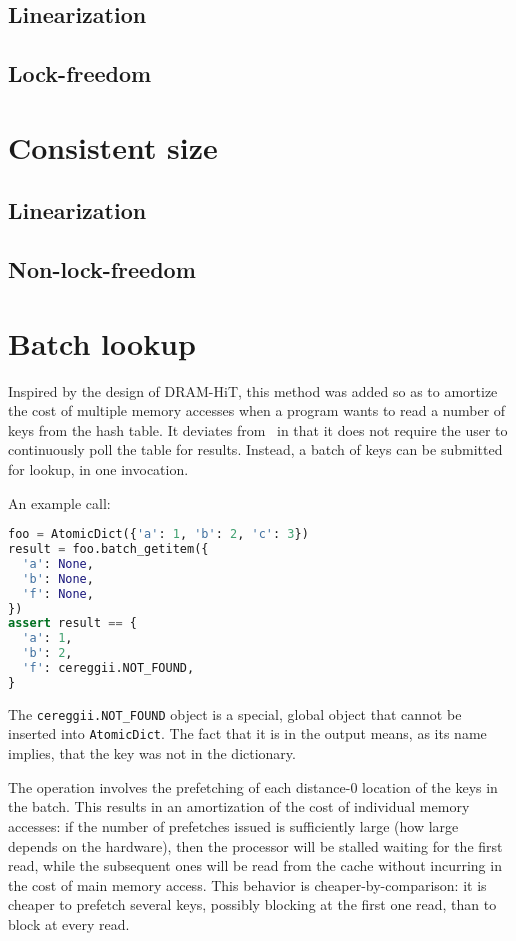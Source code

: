 \subsection{Linearization}
\subsection{Lock-freedom}

\section{Consistent size}\label{sec:consistent-size}

\subsection{Linearization}
\subsection{Non-lock-freedom}

\section{Batch lookup}\label{sec:batch-lookup}

Inspired by the design of DRAM-HiT, this method was added so as to amortize the cost of multiple memory accesses when a program wants to read a number of keys from the hash table.
It deviates from~\cite{dramhit} in that it does not require the user to continuously poll the table for results.
Instead, a batch of keys can be submitted for lookup, in one invocation.

An example call:

\begin{lstlisting}[language=Python]
foo = AtomicDict({'a': 1, 'b': 2, 'c': 3})
result = foo.batch_getitem({
  'a': None,
  'b': None,
  'f': None,
})
assert result == {
  'a': 1,
  'b': 2,
  'f': cereggii.NOT_FOUND,
}
\end{lstlisting}

The \texttt{cereggii.NOT\_FOUND} object is a special, global object that cannot be inserted into \texttt{AtomicDict}.
The fact that it is in the output means, as its name implies, that the key was not in the dictionary.

The operation involves the prefetching of each distance-0 location of the keys in the batch.
This results in an amortization of the cost of individual memory accesses: if the number of prefetches issued is sufficiently large (how large depends on the hardware), then the processor will be stalled waiting for the first read, while the subsequent ones will be read from the cache without incurring in the cost of main memory access.
This behavior is cheaper-by-comparison: it is cheaper to prefetch several keys, possibly blocking at the first one read, than to block at every read.

